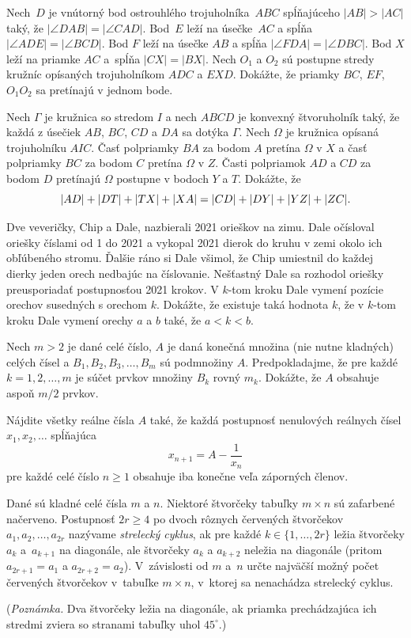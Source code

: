 {%
Nech~$D$ je vnútorný bod ostrouhlého trojuholníka~$ABC$ spĺňajúceho $|AB|>|AC|$ taký, že
$|\angle DAB|= |\angle CAD|$. Bod~$E$ leží na úsečke~$AC$ a spĺňa $|\angle ADE|= |\angle BCD|$. Bod $F$ leží na úsečke $AB$
a spĺňa $|\angle FDA|= |\angle DBC|$. Bod $X$ leží na priamke $AC$ a~spĺňa $|CX|= |BX|$. Nech $O_1$ a $O_2$ sú
postupne stredy kružníc opísaných trojuholníkom $ADC$ a $EXD$. Dokážte, že priamky $BC$, $EF$, $O_1O_2$
sa pretínajú v jednom bode.}

{%
Nech $\Gamma$ je kružnica so stredom $I$ a nech $ABCD$ je konvexný štvoruholník taký, že každá
z úsečiek $AB$, $BC$, $CD$ a $DA$ sa dotýka $\Gamma$. Nech $\Omega$ je kružnica opísaná trojuholníku $AIC$. Časť
polpriamky $BA$ za bodom $A$ pretína $\Omega$ v $X$ a časť polpriamky $BC$ za bodom $C$ pretína $\Omega$ v $Z$. Časti
polpriamok $AD$ a $CD$ za bodom $D$ pretínajú $\Omega$ postupne v bodoch $Y$ a $T$. Dokážte, že
$$
|AD|+ |DT |+ |T X|+ |XA|= |CD|+ |DY |+ |Y Z|+ |ZC|.
\belowdisplayskip0pt
$$}

{%
Dve veveričky, Chip a Dale, nazbierali 2021 orieškov na zimu. Dale očísloval oriešky
číslami od 1 do 2021 a vykopal 2021 dierok do kruhu v zemi okolo ich obľúbeného stromu. Ďalšie ráno
si Dale všimol, že Chip umiestnil do každej dierky jeden orech nedbajúc na číslovanie. Nešťastný Dale
sa rozhodol oriešky preusporiadať postupnosťou 2021 krokov. V $k$-tom kroku Dale vymení pozície
orechov susedných s orechom $k$. Dokážte, že existuje taká hodnota $k$, že v $k$-tom kroku Dale vymení
orechy $a$ a $b$ také, že $a < k < b$.}

{%
Nech $m >2$ je dané celé číslo, $A$ je daná konečná množina (nie nutne kladných) celých
čísel a $B_1, B_2, B_3, \ldots , B_m$ sú podmnožiny $A$. Predpokladajme, že pre každé $k = 1, 2, \ldots , m$ je súčet
prvkov množiny $B_k$ rovný $m_k$. Dokážte, že $A$ obsahuje aspoň $m/2$ prvkov.}

{%
Nájdite všetky reálne čísla $A$ také, že každá postupnosť nenulových reálnych čísel $x_1,x_2,\dots$ spĺňajúca
$$
x_{n+1}=A-\frac{1}{x_n}
$$
pre každé celé číslo $n\ge1$ obsahuje iba konečne veľa záporných členov.}

{%
Dané sú kladné celé čísla $m$ a $n$. Niektoré štvorčeky tabuľky $m \times n$ sú zafarbené načerveno. Postupnosť $2r \ge 4$ po dvoch rôznych červených štvorčekov $a_1, a_2, \dots, a_{2r}$ nazývame \emph{strelecký cyklus}, ak pre každé $k\in\{1,\dots, 2r\}$ ležia štvorčeky $a_k$ a~$a_{k+1}$ na diagonále, ale štvorčeky $a_k$ a $a_{k+2}$ neležia na diagonále (pritom $a_{2r+1}=a_1$ a $a_{2r+2}=a_2$). V~závislosti od $m$ a~$n$ určte najväčší možný počet červených štvorčekov v~tabuľke $m \times n$, v~ktorej sa nenachádza strelecký cyklus.

(\emph{Poznámka.} Dva štvorčeky ležia na diagonále, ak priamka prechádzajúca ich stredmi zviera so stranami tabuľky uhol $45^\circ$.)}


